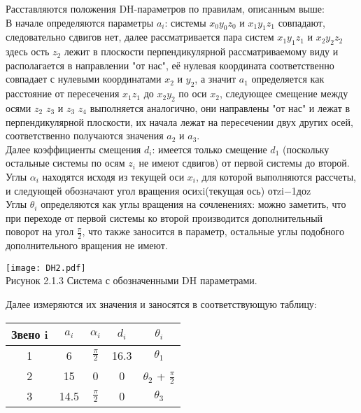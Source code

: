 \hspace*{\parindent}Расставляются положения DH-параметров по правилам, описанным выше:\\ 
\hspace*{\parindent}В начале определяются параметры $a_i$: системы $x_0y_0z_0$ и $x_1y_1z_1$ совпадают, следовательно сдвигов нет, далее рассматривается пара систем $x_1y_1z_1$ и $x_2y_2z_2$ здесь ость $z_2$ лежит в плоскости перпендикулярной рассматриваемому виду и располагается в направлении "от нас", её нулевая координата соответственно совпадает с нулевыми координатами $x_2$ и $y_2$, а значит $a_1$ определяется как расстояние от пересечения $x_1z_1$ до  $x_2y_2$ по оси $x_2$, следующее смещение между осями $z_2$ $z_3$ и $z_3$ $z_4$ выполняется аналогично, они направлены "от нас" и лежат в перпендикулярной плоскости, их начала лежат на пересечении двух других осей, соответственно получаются значения $a_2$ и $a_3$.\\
\hspace*{\parindent}Далее коэффициенты смещения $d_i$: имеется только смещение $d_1$ (поскольку остальные системы по осям $z_i$ не имеют сдвигов) от первой системы до второй.\\
Углы $\alpha_i$ находятся исходя из текущей оси $x_i$, для которой выполняются рассчеты, и следующей 
обозначают угол вращения осиxi(текущая ось) отzi−1доz
\\
\hspace*{\parindent}Углы $\theta_i$ определяются как углы вращения на сочленениях: можно заметить, что при переходе от первой системы ко второй производится дополнительный поворот на угол $\frac{\pi}{2}$, что также заносится в параметр, остальные углы подобного дополнительного вращения не имеют.\\
\begin{center}
    \texttt{[image: DH2.pdf]}\\
    Рисунок 2.1.3 Система с обозначенными DH параметрами.\\
\end{center}

\hspace*{\parindent}Далее измеряются их значения и заносятся в соответствующую таблицу:\\

\begin{table}[h!]
\begin{center}
\begin{tabular}{|c|c|c|c|c|}
\hline
Звено i & $a_i$ & $\alpha_i$ & $d_i$ & $\theta_i$ \\
\hline
1 & 6 & $\frac{\pi}{2}$ & 16.3 & $\theta_1$\\
\hline
2 & 15 & 0 & 0 & $\theta_2$ + $\frac{\pi}{2}$\\
\hline
3 & 14.5 & $\frac{\pi}{2}$ & 0 & $\theta_3$\\
\hline
\end{tabular}
\end{center}
\end{table} 

